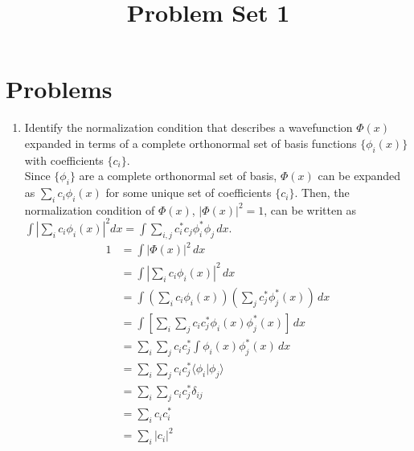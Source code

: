 \documentclass{article}
\title{\textbf{Problem Set 1}}
\author{}
\date{}
\begin{document}
\maketitle

\section*{Problems}


\begin{enumerate}[label=\textbf{\arabic*.}]
    \item Identify the normalization condition that describes a wavefunction \( \Phi (x) \) expanded in terms of a complete orthonormal set of basis functions \( \{\phi_i (x)\} \) with coefficients \( \{c_i\} \).\\

    Since $\{\phi_i\}$ are a complete orthonormal set of basis, 
    $\Phi(x)$ can be expanded as $\sum_i c_i \phi_i(x)$ for some unique set of coefficients $\{c_i\}$. 
    Then, the normalization condition of $\Phi(x)$, $|\Phi(x)|^2 = 1$, can be written
    as $\int \left|\sum_i c_i \phi_i(x)\right|^2 dx = \int \sum_{i,j} c_i^* c_j 
    \phi_i^* \phi_j \, dx$.
    \begin{align*}
        1 &= \int |\Phi(x)|^2 \, dx \\
        &= \int \left| \sum_i c_i \phi_i(x) \right|^2 \, dx \\
        &= \int \left( \sum_i c_i \phi_i(x) \right) \left( \sum_j c_j^* \phi_j^*(x) \right) \, dx \\
        &= \int \left[ \sum_i \sum_j c_i c_j^* \phi_i(x) \phi_j^*(x) \right] \, dx \\
        &= \sum_i \sum_j c_i c_j^* \int \phi_i(x) \phi_j^*(x) \, dx \\
        &= \sum_i \sum_j c_i c_j^* \langle \phi_i | \phi_j \rangle \\
        &= \sum_i \sum_j c_i c_j^* \delta_{ij} \\
        &= \sum_i c_i c_i^* \\
        &= \sum_i |c_i|^2
    \end{align*}


\end{enumerate}
\end{document}
